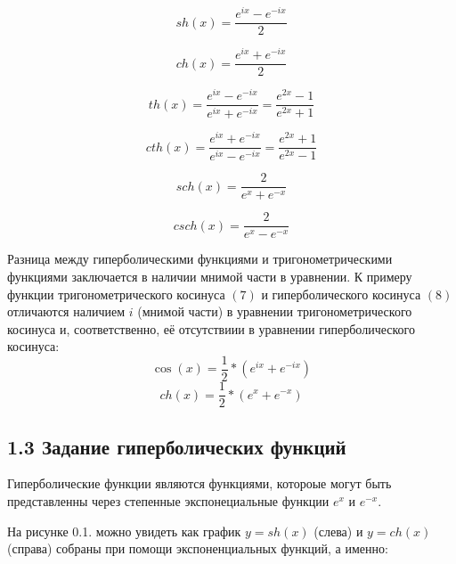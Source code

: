 \documentclass{article}
\begin{document}
\begin{equation}
    sh(x)=\frac{e^{ix}-e^{-ix}}{2}
 \end{equation}
 
 \begin{equation}
    ch(x)=\frac{e^{ix}+e^{-ix}}{2}
 \end{equation}
 
 \begin{equation}
    th(x)=\frac{e^{ix}-e^{-ix}}{e^{ix}+e^{-ix}}=\frac{e^{2x}-1}{e^{2x}+1}
 \end{equation}
 
 \begin{equation}
    cth(x)=\frac{e^{ix}+e^{-ix}}{e^{ix}-e^{-ix}}=\frac{e^{2x}+1}{e^{2x}-1}
 \end{equation}
 
 \begin{equation}
    sch(x)=\frac{2}{e^{x}+e^{-x}}
 \end{equation}
 
 \begin{equation}
    csch(x)=\frac{2}{e^{x}-e^{-x}}
 \end{equation}
 
Разница между гиперболическими функциями и тригонометрическими функциями заключается в наличии мнимой части в уравнении. 
К примеру функции тригонометрического косинуса $(7)$ и гиперболического косинуса $(8)$ отличаются наличием $i$ (мнимой части) в уравнении тригонометрического косинуса и, соответственно, её отсутствиии в уравнении гиперболического косинуса:\\
 \begin{equation}
    \cos(x)=\frac{1}{2}*(e^{ix}+e^{-ix})
 \end{equation}
 \begin{equation}
    ch(x)=\frac{1}{2}*(e^{x}+e^{-x})
\end{equation}

\subsection*{1.3 Задание гиперболических функций}

Гиперболические функции являются функциями, котороые могут быть представленны через степенные экспонециальные функции $e^x$ и $e^{-x}$. 

На рисунке 0.1. можно увидеть как график $y = sh(x)$ (слева) и $y=ch(x)$ (справа) собраны при помощи экспоненциальных функций, а именно:
\end{document}
